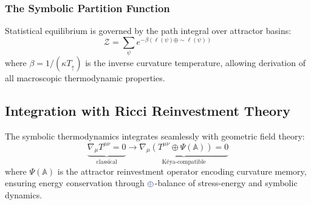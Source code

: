 \subsubsection{The Symbolic Partition Function}
Statistical equilibrium is governed by the path integral over attractor basins:
\[ \mathcal{Z} = \sum_{\psi} e^{-\beta (\ell(\psi) \oplus \sim\ell(\psi))} \]
where $\beta = 1 / (\kappa T_\uparrow)$ is the inverse curvature temperature, allowing derivation of all macroscopic thermodynamic properties.

\subsection{Integration with Ricci Reinvestment Theory}
The symbolic thermodynamics integrates seamlessly with geometric field theory:
\[
\underbrace{\nabla_\mu T^{\mu\nu} = 0}_{\text{classical}} \longrightarrow \underbrace{\nabla_\mu \left( T^{\mu\nu} \oplus \Psi(\mathbb{A}) \right) = 0}_{\text{Kéya-compatible}}
\]
where $\Psi(\mathbb{A})$ is the attractor reinvestment operator encoding curvature memory, ensuring energy conservation through $\fuse$-balance of stress-energy and symbolic dynamics. 